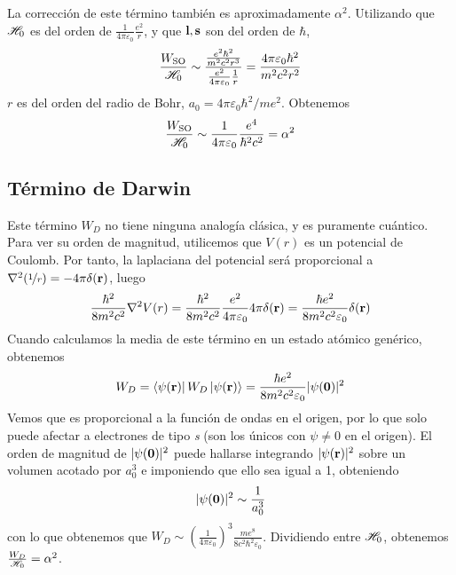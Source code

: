 La corrección de este término también es aproximadamente $\alpha^2$.
Utilizando que $ \mathscr{H} _0$ es del orden de
$\frac{1}{4\pi\varepsilon_0} \frac{e^2}{r}$, y que
$\bm{\mathrm{l}},\bm{\mathrm{s}}$ son del orden de $\hbar$,
\begin{equation}
  \frac{W_{\text{SO}}}{ \mathscr{H} _0} \sim \frac{\frac{e^2
      \hbar^2}{m^2c^2r^3}}{\frac{e^2}{4\pi \varepsilon_0}\frac{1}{r}} = \frac{4\pi\varepsilon_0\hbar^2}{m^2c^2r^2}
\end{equation}
$r$ es del orden del radio de Bohr, $a_0 = 4\pi\varepsilon_0\hbar^2/me^2$. Obtenemos
\begin{equation}
 \frac{W_{\text{SO}}}{ \mathscr{H} _0} \sim \frac{1}{4\pi\varepsilon_0}\frac{e^4}{\hbar^2c^2}=\alpha^2
\end{equation}

\subsection{Término de Darwin}
Este término $W_D$ no tiene ninguna analogía clásica, y es puramente
cuántico. Para ver su orden de magnitud, utilicemos que $V(r)$ es un
potencial de Coulomb. Por tanto, la laplaciana del potencial será
proporcional a $\nabla^2(\nicefrac{1}{r})=-4\pi\delta(\bm{\mathrm{r}})$,
luego
\begin{equation}
  \frac{\hbar^2}{8m^2c^2} \nabla^2V(r) =
  \frac{\hbar^2}{8m^2c^2}\frac{e^2}{4\pi\varepsilon_0}4\pi\delta(\bm{\mathrm{r}})
  = \frac{\hbar e^2}{8m^2c^2\varepsilon_0}\delta(\bm{\mathrm{r}})
\end{equation}
Cuando calculamos la media de este término en un estado atómico
genérico, obtenemos
\begin{equation}
  W_D = \bra{\psi(\bm{\mathrm{r}})} W_D \ket{\psi(\bm{\mathrm{r}})} =
  \frac{\hbar e^2}{8m^2c^2\varepsilon_0} |\psi(\bm{\mathrm{0}})|^2
\end{equation}
Vemos que es proporcional a la función de ondas en el origen, por lo
que solo puede afectar a electrones de tipo \emph{s} (son los únicos
con $\psi\neq 0$ en el origen). El orden de magnitud de $|\psi(\bm{\mathrm{0}})|^2$
puede hallarse integrando $|\psi(\bm{\mathrm{r}})|^2$ sobre un volumen
acotado por $a_0^3$ e imponiendo que ello sea igual a 1, obteniendo
\begin{equation}
  |\psi(\bm{\mathrm{0}})|^2 \sim \frac{1}{a_0^3}
\end{equation}
con lo que obtenemos que $W_D \sim \left( \frac{1}{4\pi\varepsilon_0}
\right)^3 \frac{me^8}{8c^2 \hbar^2 \varepsilon_0}$. Dividiendo entre
$ \mathscr{H} _0$, obtenemos $\frac{W_D}{ \mathscr{H} _0} = \alpha^2$. 

